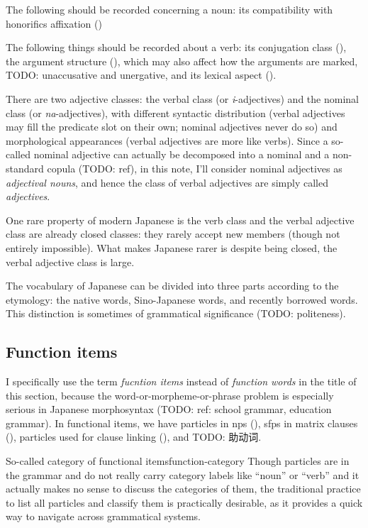 \documentclass[UTF8, a4paper, oneside, scheme=plain]{ctexrep}
\newcommand*{\term}[1]{\emph{#1}}
\newcommand{\corpus}[1]{\emph{#1}}
\begin{document}
The following should be recorded concerning a noun:
its compatibility with honorifics affixation ()

The following things should be recorded about a verb:
its conjugation class (),
the argument structure (),
which may also affect how the arguments are marked,
TODO: unaccusative and unergative,
and its lexical aspect ().

There are two adjective classes:
the verbal class (or \corpus{i}-adjectives)
and the nominal class (or \corpus{na}-adjectives),
with different syntactic distribution 
(verbal adjectives may fill the predicate slot on their own; nominal adjectives never do so)
and morphological appearances
(verbal adjectives are more like verbs).
Since a so-called nominal adjective 
can actually be decomposed into a nominal and a non-standard copula (TODO: ref),
in this note, I'll consider nominal adjectives as \emph{adjectival nouns},
and hence the class of verbal adjectives are simply called \emph{adjectives}.

One rare property of modern Japanese is the verb class and the verbal adjective class 
are already closed classes:
they rarely accept new members (though not entirely impossible).
What makes Japanese rarer is despite being closed,
the verbal adjective class is large.

The vocabulary of Japanese can be divided into three parts according to the etymology:
the native words,
Sino-Japanese words,
and recently borrowed words.
This distinction is sometimes of grammatical significance (TODO: politeness).

\subsection{Function items}

I specifically use the term \term{fucntion items} instead of \term{function words}
in the title of this section,
because the word-or-morpheme-or-phrase problem is especially serious in Japanese morphosyntax
(TODO: ref: school grammar, education grammar).
In functional items,
we have particles in \acs{np}s (),
\acs{sfp}s in matrix clauses (),
particles used for clause linking (),
and TODO: 助动词.

\begin{theorybox}{So-called category of functional items}{function-category}
    Though particles are in the grammar and do not really carry category labels like ``noun'' or ``verb''
    and it actually makes no sense to discuss the categories of them,
    the traditional practice to list all particles and classify them 
    is practically desirable, 
    as it provides a quick way to navigate across grammatical systems.
\end{theorybox}
\end{document}
